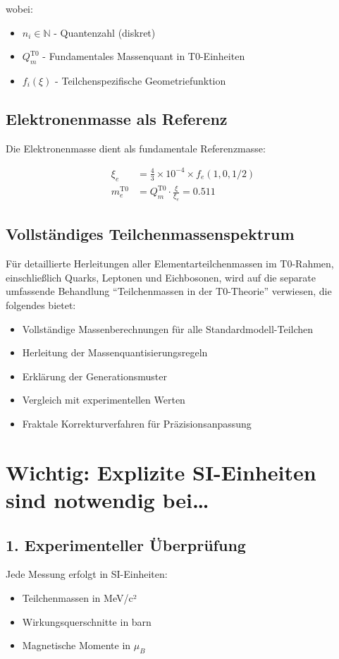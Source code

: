 	wobei:
	\begin{itemize}
		\item $n_i \in \mathbb{N}$ - Quantenzahl (diskret)
		\item $Q_m^{\mathrm{T0}}$ - Fundamentales Massenquant in T0-Einheiten
		\item $f_i(\xi)$ - Teilchenspezifische Geometriefunktion
	\end{itemize}
	
	\subsection{Elektronenmasse als Referenz}
	
	Die Elektronenmasse dient als fundamentale Referenzmasse:
	
	\begin{align}
		\xi_e &= \frac{4}{3} \times 10^{-4} \times f_e(1,0,1/2) \\
		m_e^{\mathrm{T0}} &= Q_m^{\mathrm{T0}} \cdot \frac{\xi}{\xi_e} = 0.511
	\end{align}
	
	\subsection{Vollständiges Teilchenmassenspektrum}
	
	Für detaillierte Herleitungen aller Elementarteilchenmassen im T0-Rahmen, einschließlich Quarks, Leptonen und Eichbosonen, wird auf die separate umfassende Behandlung ``Teilchenmassen in der T0-Theorie'' verwiesen, die folgendes bietet:
	
	\begin{itemize}
		\item Vollständige Massenberechnungen für alle Standardmodell-Teilchen
		\item Herleitung der Massenquantisierungsregeln
		\item Erklärung der Generationsmuster
		\item Vergleich mit experimentellen Werten
		\item Fraktale Korrekturverfahren für Präzisionsanpassung
	\end{itemize}
	
	\section{Wichtig: Explizite SI-Einheiten sind notwendig bei\dots}
	\label{sec:si-notwendig}
	
	\subsection{1. Experimenteller Überprüfung}
	Jede Messung erfolgt in SI-Einheiten:
	\begin{itemize}
		\item Teilchenmassen in MeV/c²
		\item Wirkungsquerschnitte in barn
		\item Magnetische Momente in $\mu_B$
	\end{itemize}
	
